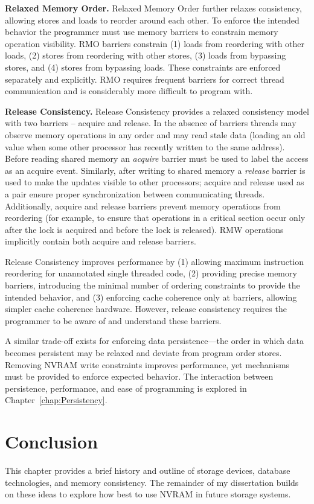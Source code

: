 \textbf{Relaxed Memory Order.}
Relaxed Memory Order \cite{SPARCv9} further relaxes consistency, allowing stores and loads to reorder around each other.
To enforce the intended behavior the programmer must use memory barriers to constrain memory operation visibility.
RMO barriers constrain (1) loads from reordering with other loads, (2) stores from reordering with other stores, (3) loads from bypassing stores, and (4) stores from bypassing loads.
These constraints are enforced separately and explicitly.
RMO requires frequent barriers for correct thread communication and is considerably more difficult to program with.

\textbf{Release Consistency.}
Release Consistency \cite{GharachorlooLenoski90} provides a relaxed consistency model with two barriers -- acquire and release.
In the absence of barriers threads may observe memory operations in any order and may read stale data (loading an old value when some other processor has recently written to the same address).
Before reading shared memory an \emph{acquire} barrier must be used to label the access as an acquire event.
Similarly, after writing to shared memory a \emph{release} barrier is used to make the updates visible to other processors; acquire and release used as a pair ensure proper synchronization between communicating threads.
Additionally, acquire and release barriers prevent memory operations from reordering (for example, to ensure that operations in a critical section occur only after the lock is acquired and before the lock is released).
RMW operations implicitly contain both acquire and release barriers.

Release Consistency improves performance by (1) allowing maximum instruction reordering for unannotated single threaded code, (2) providing precise memory barriers, introducing the minimal number of ordering constraints to provide the intended behavior, and (3) enforcing cache coherence only at barriers, allowing simpler cache coherence hardware.
However, release consistency requires the programmer to be aware of and understand these barriers.

A similar trade-off exists for enforcing data persistence---the order in which data becomes persistent may be relaxed and deviate from program order stores.
Removing NVRAM write constraints improves performance, yet mechanisms must be provided to enforce expected behavior.
The interaction between persistence, performance, and ease of programming is explored in Chapter~\ref{chap:Persistency}.

\section{Conclusion}
\label{sec:Background:Conclusion}

This chapter provides a brief history and outline of storage devices, database technologies, and memory consistency.
The remainder of my dissertation builds on these ideas to explore how best to use NVRAM in future storage systems.
